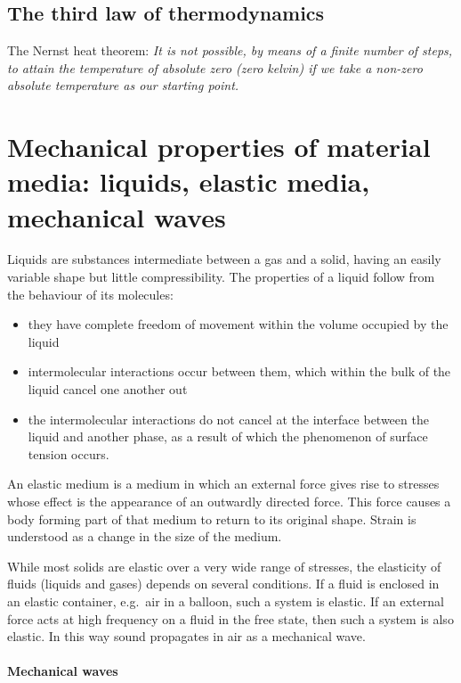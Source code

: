 \subsection{The third law of thermodynamics}

The Nernst heat theorem: \textit{It is not possible, by means of a finite number of steps, to attain the temperature of absolute zero (zero kelvin) if we take a non-zero absolute temperature as our starting point.}

\section{Mechanical properties of material media: liquids, elastic media, mechanical waves}

Liquids are substances intermediate between a gas and a solid, having an easily variable shape but little compressibility. The properties of a liquid follow from the behaviour of its molecules:

\begin{itemize}
    \item they have complete freedom of movement within the volume occupied by the liquid
    \item intermolecular interactions occur between them, which within the bulk of the liquid cancel one another out
    \item the intermolecular interactions do not cancel at the interface between the liquid and another phase, as a result of which the phenomenon of surface tension occurs.
\end{itemize}

An elastic medium is a medium in which an external force gives rise to stresses whose effect is the appearance of an outwardly directed force. This force causes a body forming part of that medium to return to its original shape. Strain is understood as a change in the size of the medium.

While most solids are elastic over a very wide range of stresses, the elasticity of fluids (liquids and gases) depends on several conditions. If a fluid is enclosed in an elastic container, e.g.\ air in a balloon, such a system is elastic. If an external force acts at high frequency on a fluid in the free state, then such a system is also elastic. In this way sound propagates in air as a mechanical wave.

\paragraph{Mechanical waves}

